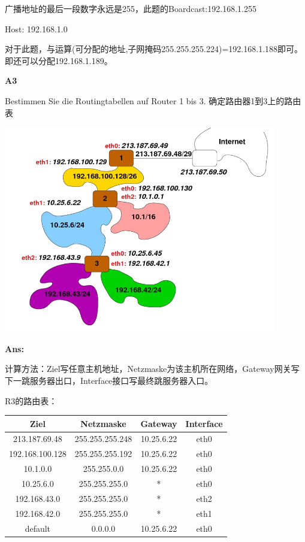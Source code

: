 \documentclass[fleqn]{article}
\begin{document}
\indent 广播地址的最后一段数字永远是255，此题的Boardcast:192.168.1.255

\indent Host: 192.168.1.0

\indent 对于此题，与运算(可分配的地址,子网掩码255.255.255.224)=192.168.1.188即可。即还可以分配192.168.1.189。

\noindent\textbf{A3}

Bestimmen Sie die Routingtabellen auf Router 1 bis 3. 确定路由器1到3上的路由表

\begin{center}
    \includegraphics[scale=0.6]{bild9.png}
\end{center}

\textbf{Ans:}

计算方法：Ziel写任意主机地址，Netzmaske为该主机所在网络，Gateway网关写下一跳服务器出口，Interface接口写最终跳服务器入口。

R3的路由表：
\begin{center}
    \begin{tabular}{c|c|c|c}
        Ziel&Netzmaske&Gateway&Interface\\
        \hline
        213.187.69.48&255.255.255.248&10.25.6.22&eth0\\
        192.168.100.128&255.255.255.192&10.25.6.22&eth0\\
        10.1.0.0&255.255.0.0&10.25.6.22&eth0\\
        10.25.6.0&255.255.255.0&*&eth0\\
        192.168.43.0&255.255.255.0&*&eth2\\
        192.168.42.0&255.255.255.0&*&eth1\\
        default&0.0.0.0&10.25.6.22&eth0
    \end{tabular}
\end{center}
\end{document}
